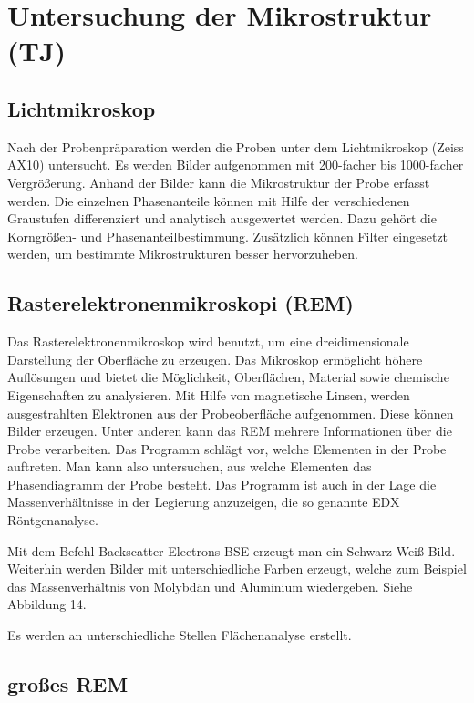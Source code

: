 \section{Untersuchung der Mikrostruktur (TJ)}

\subsection{Lichtmikroskop}

Nach der Probenpräparation werden die Proben unter dem Lichtmikroskop (Zeiss AX10) untersucht. Es werden Bilder aufgenommen mit 200-facher bis 1000-facher Vergrößerung. Anhand der Bilder kann die Mikrostruktur der Probe erfasst werden. Die einzelnen Phasenanteile können mit Hilfe der verschiedenen Graustufen differenziert und analytisch ausgewertet werden. Dazu gehört die Korngrößen- und Phasenanteilbestimmung. 
Zusätzlich können Filter eingesetzt werden, um bestimmte Mikrostrukturen besser hervorzuheben.

\subsection{Rasterelektronenmikroskopi (REM)}

Das Rasterelektronenmikroskop wird benutzt, um eine dreidimensionale Darstellung der Oberfläche zu erzeugen. Das Mikroskop ermöglicht höhere Auflösungen und bietet die Möglichkeit, Oberflächen, Material sowie chemische Eigenschaften zu analysieren. Mit Hilfe von magnetische Linsen, werden ausgestrahlten Elektronen aus der Probeoberfläche aufgenommen. Diese können Bilder erzeugen. Unter anderen kann das REM mehrere Informationen über die Probe verarbeiten. Das Programm schlägt vor, welche Elementen in der Probe auftreten. Man kann also untersuchen, aus welche Elementen das Phasendiagramm der Probe besteht. Das Programm ist auch in der Lage die Massenverhältnisse in der Legierung anzuzeigen, die so genannte EDX Röntgenanalyse.   

Mit dem Befehl Backscatter Electrons BSE erzeugt man ein Schwarz-Weiß-Bild. Weiterhin werden Bilder mit unterschiedliche Farben erzeugt, welche zum Beispiel das Massenverhältnis von Molybdän und Aluminium wiedergeben. Siehe Abbildung 14.

Es werden an unterschiedliche Stellen Flächenanalyse erstellt. 

\subsection{großes REM}

